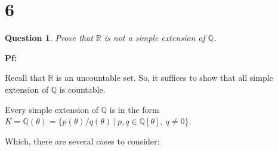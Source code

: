 \documentclass{article}
\newtheorem{question}{Question}
\begin{document}
\break

\section*{6}
\begin{myBox}[]{}
    \begin{question}
        Prove that $\mathbb{R}$ is not a simple extension of $\mathbb{Q}$.
    \end{question}
\end{myBox}

\textbf{Pf:}

Recall that $\mathbb{R}$ is an uncountable set. So, it suffices to show that all simple extension of $\mathbb{Q}$ is countable.

Every simple extension of $\mathbb{Q}$ is in the form $K=\mathbb{Q}(\theta) = \{p(\theta)/q(\theta)\ |\ p,q\in \mathbb{Q}[\theta],\ q\neq 0\}$.

Which, there are several cases to consider:
\end{document}
